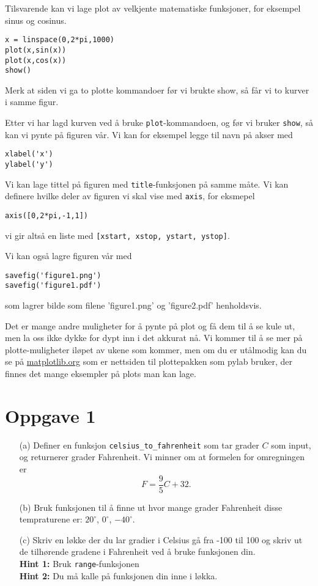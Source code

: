\documentclass[a4paper, 11pt, notitlepage]{article}
\begin{document}
Tilsvarende kan vi lage plot av velkjente matematiske funksjoner, for eksempel sinus og cosinus.
\begin{lstlisting}
x = linspace(0,2*pi,1000)
plot(x,sin(x))
plot(x,cos(x))
show()
\end{lstlisting}
\vspace{-0.3cm}
Merk at siden vi ga to plotte kommandoer før vi brukte show, så får vi to kurver i samme figur.

Etter vi har lagd kurven ved å bruke \verb+plot+-kommandoen, og før vi bruker \verb+show+, så kan vi pynte på figuren vår. Vi kan for eksempel legge til navn på akser med
\begin{lstlisting}
xlabel('x')
ylabel('y')
\end{lstlisting}
\vspace{-0.3cm}
Vi kan lage tittel på figuren med \verb+title+-funksjonen på samme måte. Vi kan definere hvilke deler av figuren vi skal vise med \verb+axis+, for eksmepel
\begin{lstlisting}
axis([0,2*pi,-1,1])
\end{lstlisting}
\vspace{-0.3cm}
vi gir altså en liste med \verb+[xstart, xstop, ystart, ystop]+.

Vi kan også lagre figuren vår med
\begin{lstlisting}
savefig('figure1.png')
savefig('figure1.pdf')
\end{lstlisting}
\vspace{-0.3cm}
som lagrer bilde som filene 'figure1.png' og 'figure2.pdf' henholdsvis.

Det er mange andre muligheter for å pynte på plot og få dem til å se kule ut, men la oss ikke dykke for dypt inn i det akkurat nå. Vi kommer til å se mer på plotte-muligheter iløpet av ukene som kommer, men om du er utålmodig kan du se på \url{matplotlib.org} som er nettsiden til plottepakken som pylab bruker, der finnes det mange eksempler på plots man kan lage.



\clearpage


\section*{Oppgave 1}
\begin{itemize}
\item[(a)] Definer en funksjon \verb+celsius_to_fahrenheit+ som tar grader $C$ som input, og returnerer grader Fahrenheit. Vi minner om at formelen for omregningen er
$$F = \frac{9}{5}C + 32.$$
\item[(b)] Bruk funksjonen til å finne ut hvor mange grader Fahrenheit disse tempraturene er: $20^\circ$, $0^\circ$, $-40^\circ$. 
\item[(c)] Skriv en løkke der du lar gradier i Celsius gå fra -100 til 100 og skriv ut de tilhørende gradene i Fahrenheit ved å bruke funksjonen din. \\ \textbf{Hint 1:} Bruk \texttt{range}-funksjonen \\
\textbf{Hint 2:} Du må kalle på funksjonen din inne i løkka.
\end{itemize}
\end{document}
